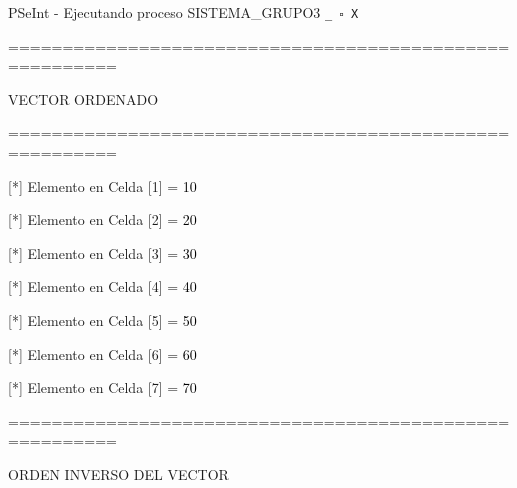 \documentclass[12pt,a4paper]{article}
\newcommand{\consola}[1]{\noindent\textcolor{pseString}{#1}}
\newcommand{\entrada}[1]{\textcolor{black}{#1}}
\newenvironment{PSeIntWindow}{%
	\begin{tcolorbox}[
		breakable,
		enhanced,
		colback=white,
		colframe=black!60,
		boxrule=0.5pt,
		arc=1mm,
		left=0mm,
		right=0mm,
		top=0mm,
		bottom=2mm,
		width=\textwidth
		]
	}{%
	\end{tcolorbox}
}
\newcommand{\BarraPSeInt}{%
	\colorbox{gray!20}{%
		\parbox{\dimexpr\textwidth-2\fboxsep\relax}{%
			\small
			\textcolor{pseString}{\faPlayCircle}
			\hspace{0.3em}
			PSeInt - Ejecutando proceso SISTEMA\_GRUPO3
			\hfill
			\texttt{\_ \hspace{0.5em} \(\square\) \hspace{0.5em} X}
		}
	}
}
\begin{document}
	\begin{PSeIntWindow}
		
		\BarraPSeInt
		
		\vspace{0.2cm}
		
		\ttfamily\small
		
		\consola{========================================================}\par
		
		\vspace{0.2cm}
		
		\consola{VECTOR ORDENADO}\par
		
		\vspace{0.2cm}
		
		\consola{========================================================}\par
		
		\vspace{0.3cm}
		
		\consola{[*] Elemento en Celda [1] = }\entrada{10}\par
		
		\consola{[*] Elemento en Celda [2] = }\entrada{20}\par
		
		\consola{[*] Elemento en Celda [3] = }\entrada{30}\par
		
		\consola{[*] Elemento en Celda [4] = }\entrada{40}\par
		
		\consola{[*] Elemento en Celda [5] = }\entrada{50}\par
		
		\consola{[*] Elemento en Celda [6] = }\entrada{60}\par
		
		\consola{[*] Elemento en Celda [7] = }\entrada{70}\par
		
		\vspace{0.3cm}
		
		\consola{========================================================}\par
		
		\vspace{0.3cm}
		
		\consola{ORDEN INVERSO DEL VECTOR}\par
		
		\vspace{0.2cm}
		

\end{PSeIntWindow}
\end{document}
